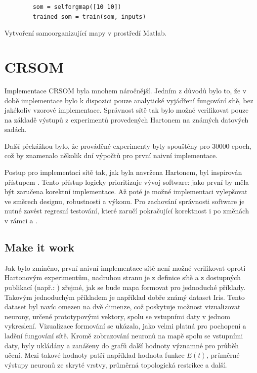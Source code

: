 \documentclass[thesis=M,czech]{FITthesis}[2012/06/26]
\begin{document}
\begin{listing}
    \begin{verbatim}
        som = selforgmap([10 10])
        trained_som = train(som, inputs)
    \end{verbatim} 
    \caption{Vytvoření samoorganizující mapy v prostředí Matlab.} 
    \label{somcode}
\end{listing}

\section{CRSOM}


Implementace CRSOM byla mnohem náročnější. Jedním z důvodů bylo to, že v době implementace bylo k dispozici pouze analytické vyjádření fungování sítě, bez jakékoliv vzorové implementace.
Správnost sítě tak bylo možné verifikovat pouze na základě výstupů z experimentů provedených Hartonem na známých datových sadách\cite{hartono14}.

Další překážkou bylo, že prováděné experimenty byly spouštěny pro $30 000$ epoch, což by znamenalo několik dní výpočtů pro první naivní implementace.
	
Postup pro implementaci sítě tak, jak byla navržena Hartonem, byl inspirován přístupem \textit{}\cite{makeit}. 
Tento přístup logicky prioritizuje vývoj software: jako první by měla být zaručena korektní implementace. Až poté je možné implementaci vylepšovat ve směrech designu, robustnosti a výkonu. Pro zachování správnosti software je nutné zavést regresní testování, které zaručí pokračující korektnost i po změnách v rámci  a .

\subsection{Make it work}
 Jak bylo zmíněno, první naivní implementace sítě není možné verifikovat oproti Hartonovým experimentům, nadruhou stranu je z definice sítě a z dostupných publikací (např.: \cite{hartono14}) zřejmé, jak se bude mapa formovat pro jednoduché příklady. Takovým jednoduchým příkladem je například dobře známý dataset Iris. Tento dataset byl navíc omezen na dvě dimenze, což poskytuje možnost vizualizovat neurony, určené prototypovými vektory, spolu se vstupními daty v jednom vykreslení. Vizualizace formování se ukázala, jako velmi platná pro pochopení a ladění fungování sítě. Kromě zobrazování neuronů na mapě spolu se vstupními daty, byly ukládány a zanášeny do grafů další hodnoty významné pro průběh učení. Mezi takové hodnoty patří například hodnota funkce $E(t)$, průměrné výstupy neuronů ze skryté vrstvy, průměrná topologická restrikce a další.
 
\end{document}
